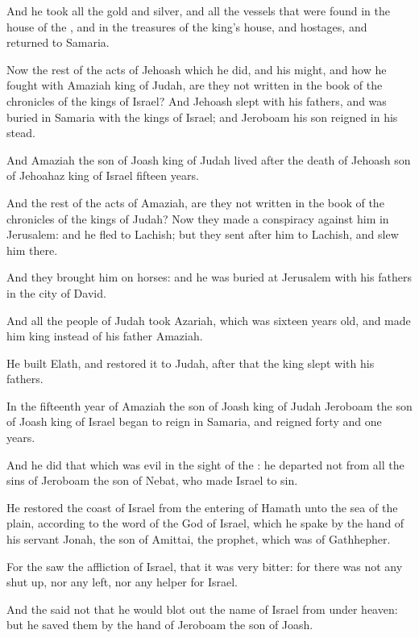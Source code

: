 \verse And he took all the gold and silver, and all the vessels that were found in the house of the \LORD, and in the treasures of the king's house, and hostages, and returned to Samaria.

\verse Now the rest of the acts of Jehoash which he did, and his might, and how he fought with Amaziah king of Judah, are they not written in the book of the chronicles of the kings of Israel?  \verse And Jehoash slept with his fathers, and was buried in Samaria with the kings of Israel; and Jeroboam his son reigned in his stead.

\verse And Amaziah the son of Joash king of Judah lived after the death of Jehoash son of Jehoahaz king of Israel fifteen years.

\verse And the rest of the acts of Amaziah, are they not written in the book of the chronicles of the kings of Judah?  \verse Now they made a conspiracy against him in Jerusalem: and he fled to Lachish; but they sent after him to Lachish, and slew him there.

\verse And they brought him on horses: and he was buried at Jerusalem with his fathers in the city of David.

\verse And all the people of Judah took Azariah, which was sixteen years old, and made him king instead of his father Amaziah.

\verse He built Elath, and restored it to Judah, after that the king slept with his fathers.

\verse In the fifteenth year of Amaziah the son of Joash king of Judah Jeroboam the son of Joash king of Israel began to reign in Samaria, and reigned forty and one years.

\verse And he did that which was evil in the sight of the \LORD: he departed not from all the sins of Jeroboam the son of Nebat, who made Israel to sin.

\verse He restored the coast of Israel from the entering of Hamath unto the sea of the plain, according to the word of the \LORD God of Israel, which he spake by the hand of his servant Jonah, the son of Amittai, the prophet, which was of Gathhepher.

\verse For the \LORD saw the affliction of Israel, that it was very bitter: for there was not any shut up, nor any left, nor any helper for Israel.

\verse And the \LORD said not that he would blot out the name of Israel from under heaven: but he saved them by the hand of Jeroboam the son of Joash.

